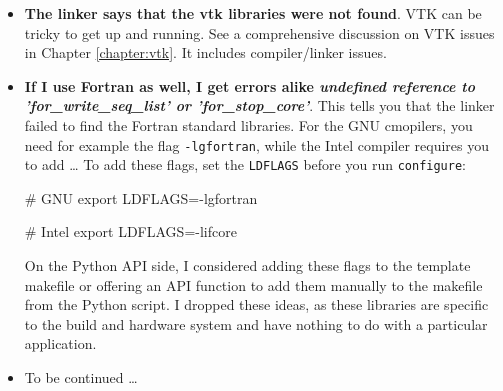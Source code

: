 \begin{itemize}
  \item \textbf{The linker says that the vtk libraries were not found}.
  VTK can be tricky to get up and running. See a comprehensive discussion on VTK
  issues in Chapter \ref{chapter:vtk}. It includes compiler/linker issues.
  \item \textbf{If I use Fortran as well, I get errors alike \emph{undefined
  reference to \linebreak 'for\_write\_seq\_list' or 'for\_stop\_core'}}. This
  tells you that the linker failed to find the Fortran standard libraries. For the GNU
  cmopilers, you need for example the flag \texttt{-lgfortran}, while the Intel
  compiler requires you to add \ldots
  To add these flags, set the \texttt{LDFLAGS} before you run
  \texttt{configure}:
  \begin{code}
# GNU
export LDFLAGS=-lgfortran

# Intel
export LDFLAGS=-lifcore
  \end{code}
  On the Python API side, I considered adding these flags to the template
  makefile or offering an API function to add them manually to the makefile from
  the Python script. I dropped these ideas, as these libraries are specific to
  the build and hardware system and have nothing to do with a particular
  application.
  \item To be continued \dots
\end{itemize}




